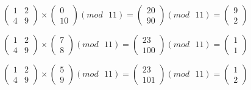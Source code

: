 \documentclass[a5paper, 10pt]{article}
\theoremstyle{definition}
\theoremstyle{plain}
\theoremstyle{remark}
\begin{document}
\begin{equation}
\begin{pmatrix}
1 & 2 \\
4 & 9
\end{pmatrix}
 \times
\begin{pmatrix}
 0\\
10
\end{pmatrix}
(mod \text{ }11)
= 
\begin{pmatrix}
 20\\
90
\end{pmatrix}
(mod \text{ }11)
= \begin{pmatrix}
 9\\
2
\end{pmatrix}
\end{equation}

\begin{equation}
\begin{pmatrix}
1 & 2 \\
4 & 9
\end{pmatrix}
 \times
\begin{pmatrix}
 7\\
8
\end{pmatrix}
(mod \text{ }11)
= 
\begin{pmatrix}
 23\\
100
\end{pmatrix}
(mod \text{ }11)
= \begin{pmatrix}
 1\\
1
\end{pmatrix}
\end{equation}

\begin{equation}
\begin{pmatrix}
1 & 2 \\
4 & 9
\end{pmatrix}
 \times
\begin{pmatrix}
 5\\
9
\end{pmatrix}
(mod \text{ }11)
= 
\begin{pmatrix}
 23\\
101
\end{pmatrix}
(mod \text{ }11)
= \begin{pmatrix}
 1\\
2
\end{pmatrix}
\end{equation}
\end{document}
